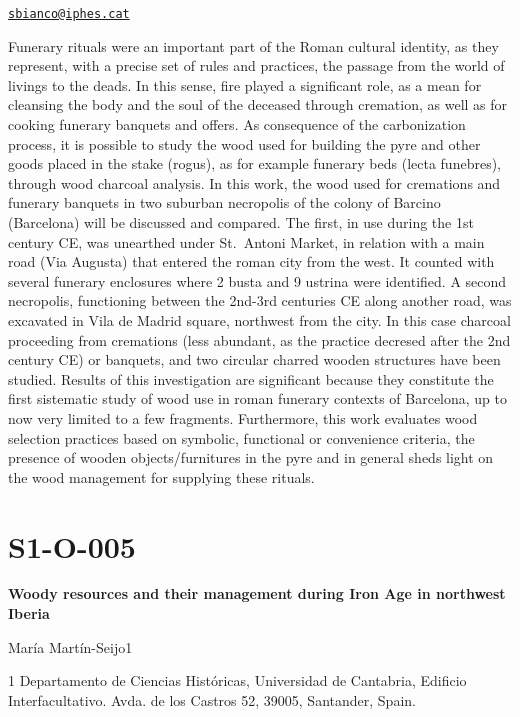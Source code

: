 \documentclass[
]{book}
\begin{document}
\href{mailto:sbianco@iphes.cat}{\nolinkurl{sbianco@iphes.cat}}

Funerary rituals were an important part of the Roman cultural identity,
as they represent, with a precise set of rules and practices, the
passage from the world of livings to the deads. In this sense, fire
played a significant role, as a mean for cleansing the body and the soul
of the deceased through cremation, as well as for cooking funerary
banquets and offers. As consequence of the carbonization process, it is
possible to study the wood used for building the pyre and other goods
placed in the stake (rogus), as for example funerary beds (lecta
funebres), through wood charcoal analysis. In this work, the wood used
for cremations and funerary banquets in two suburban necropolis of the
colony of Barcino (Barcelona) will be discussed and compared. The first,
in use during the 1st century CE, was unearthed under St.~Antoni Market,
in relation with a main road (Via Augusta) that entered the roman city
from the west. It counted with several funerary enclosures where 2 busta
and 9 ustrina were identified. A second necropolis, functioning between
the 2nd-3rd centuries CE along another road, was excavated in Vila de
Madrid square, northwest from the city. In this case charcoal proceeding
from cremations (less abundant, as the practice decresed after the 2nd
century CE) or banquets, and two circular charred wooden structures have
been studied. Results of this investigation are significant because they
constitute the first sistematic study of wood use in roman funerary
contexts of Barcelona, up to now very limited to a few fragments.
Furthermore, this work evaluates wood selection practices based on
symbolic, functional or convenience criteria, the presence of wooden
objects/furnitures in the pyre and in general sheds light on the wood
management for supplying these rituals.

\hypertarget{s1-o-005}{%
\section*{S1-O-005}\label{s1-o-005}}

\textbf{Woody resources and their management during Iron Age in northwest
Iberia}

María Martín-Seijo1

1 Departamento de Ciencias Históricas, Universidad de Cantabria,
Edificio Interfacultativo. Avda. de los Castros 52, 39005, Santander,
Spain.
\end{document}
